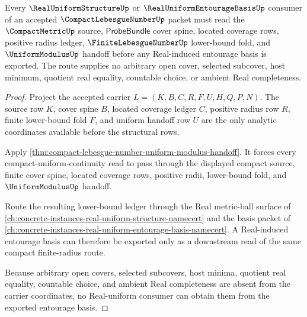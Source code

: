 \begin{theorem}
\label{thm:compact-lebesgue-number-real-uniform-entourage-route}
Every $\RealUniformStructureUp$ or $\RealUniformEntourageBasisUp$ consumer of an accepted $\CompactLebesgueNumberUp$ packet must read the $\CompactMetricUp$ source, $\mathsf{ProbeBundle}$ cover spine, located coverage rows, positive radius ledger, $\FiniteLebesgueNumberUp$ lower-bound fold, and $\UniformModulusUp$ handoff before any Real-induced entourage basis is exported. The route supplies no arbitrary open cover, selected subcover, host minimum, quotient real equality, countable choice, or ambient Real completeness.
\end{theorem}
\begin{proof}
Project the accepted carrier $L=(K,B,C,R,F,U,H,Q,P,N)$. The source row $K$, cover spine $B$, located coverage ledger $C$, positive radius row $R$, finite lower-bound fold $F$, and uniform handoff row $U$ are the only analytic coordinates available before the structural rows.

Apply \autoref{thm:compact-lebesgue-number-uniform-modulus-handoff}. It forces every compact-uniform-continuity read to pass through the displayed compact source, finite cover spine, located coverage rows, positive radii, lower-bound fold, and $\UniformModulusUp$ handoff.

Route the resulting lower-bound ledger through the Real metric-ball surface of \autoref{ch:concrete-instances-real-uniform-structure-namecert} and the basis packet of \autoref{ch:concrete-instances-real-uniform-entourage-basis-namecert}. A Real-induced entourage basis can therefore be exported only as a downstream read of the same compact finite-radius route.

Because arbitrary open covers, selected subcovers, host minima, quotient real equality, countable choice, and ambient Real completeness are absent from the carrier coordinates, no Real-uniform consumer can obtain them from the exported entourage basis.
\end{proof}


